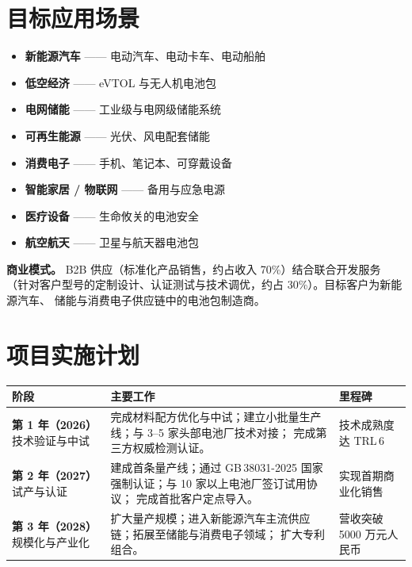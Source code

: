 \documentclass[11pt,a4paper]{ctexart}
\begin{document}
\section{目标应用场景}
\begin{multicols}{2}
\begin{itemize}
  \item \textbf{新能源汽车} —— 电动汽车、电动卡车、电动船舶
  \item \textbf{低空经济} —— eVTOL 与无人机电池包
  \item \textbf{电网储能} —— 工业级与电网级储能系统
  \item \textbf{可再生能源} —— 光伏、风电配套储能
  \item \textbf{消费电子} —— 手机、笔记本、可穿戴设备
  \item \textbf{智能家居 / 物联网} —— 备用与应急电源
  \item \textbf{医疗设备} —— 生命攸关的电池安全
  \item \textbf{航空航天} —— 卫星与航天器电池包
\end{itemize}
\end{multicols}

\vspace{-4pt}
\noindent\textbf{商业模式。} B2B 供应（标准化产品销售，约占收入 70\%）结合联合开发服务
（针对客户型号的定制设计、认证测试与技术调优，约占 30\%）。目标客户为新能源汽车、
储能与消费电子供应链中的电池包制造商。

\section{项目实施计划}
\renewcommand{\arraystretch}{1.3}
\begin{tabularx}{\linewidth}{@{}p{2.8cm}Yp{3.0cm}@{}}
\toprule
\textbf{阶段} & \textbf{主要工作} & \textbf{里程碑} \\
\midrule
\textbf{第 1 年（2026）}\newline 技术验证与中试 &
完成材料配方优化与中试；建立小批量生产线；与 3--5 家头部电池厂技术对接；
完成第三方权威检测认证。 & 技术成熟度达 TRL\,6 \\
\addlinespace[3pt]
\textbf{第 2 年（2027）}\newline 试产与认证 &
建成首条量产线；通过 GB\,38031-2025 国家强制认证；与 10 家以上电池厂签订试用协议；
完成首批客户定点导入。 & 实现首期商业化销售 \\
\addlinespace[3pt]
\textbf{第 3 年（2028）}\newline 规模化与产业化 &
扩大量产规模；进入新能源汽车主流供应链；拓展至储能与消费电子领域；
扩大专利组合。 & 营收突破 5000 万元人民币 \\
\bottomrule
\end{tabularx}
\end{document}
